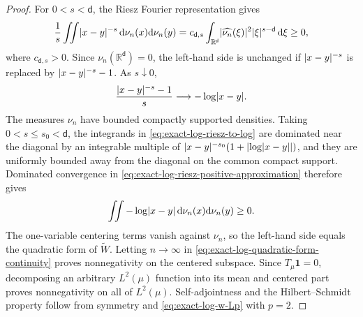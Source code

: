\documentclass[11pt,reqno]{amsart}
\numberwithin{equation}{section}
\theoremstyle{plain}
\theoremstyle{remark}
\DeclarePairedDelimiter{\abs}{\lvert}{\rvert}
\renewcommand{\d}{\mathsf{d}}
\newcommand{\md}{\mathrm{d}}
\newcommand{\R}{{\mathbb{R}}}
\newcommand{\tl}{\widetilde}
\newcommand{\one}{\mathbf 1}
\begin{document}
\begin{proof}
For $0<s<\d$, the Riesz Fourier representation gives
\begin{equation}\label{eq:exact-log-riesz-positive-approximation}
 \frac1s\iint\abs{x-y}^{-s}\,\md\nu_n(x)\md\nu_n(y)
 =c_{\d,s}\int_{\R^{\d}}
 \abs{\widehat{\nu_n}(\xi)}^2\abs{\xi}^{s-\d}\,\md\xi
 \geq0,
\end{equation}
where $c_{\d,s}>0$.  Since $\nu_n(\R^{\d})=0$, the left-hand side is unchanged if $\abs{x-y}^{-s}$ is replaced by $\abs{x-y}^{-s}-1$.  As $s\downarrow0$,
\begin{equation}\label{eq:exact-log-riesz-to-log}
 \frac{\abs{x-y}^{-s}-1}{s}
 \longrightarrow-\log\abs{x-y}.
\end{equation}
The measures $\nu_n$ have bounded compactly supported densities.  Taking $0<s\leq s_0<\d$, the integrands in \eqref{eq:exact-log-riesz-to-log} are dominated near the diagonal by an integrable multiple of $\abs{x-y}^{-s_0}(1+\abs{\log\abs{x-y}})$, and they are uniformly bounded away from the diagonal on the common compact support.  Dominated convergence in \eqref{eq:exact-log-riesz-positive-approximation} therefore gives
\begin{equation}\label{eq:exact-log-log-positive-compact}
 \iint-\log\abs{x-y}\,\md\nu_n(x)\md\nu_n(y)\geq0.
\end{equation}
The one-variable centering terms vanish against $\nu_n$, so the left-hand side equals the quadratic form of $\tl W$.  Letting $n\to\infty$ in \eqref{eq:exact-log-quadratic-form-continuity} proves nonnegativity on the centered subspace.  Since $T_\mu\one=0$, decomposing an arbitrary $L^2(\mu)$ function into its mean and centered part proves nonnegativity on all of $L^2(\mu)$.  Self-adjointness and the Hilbert--Schmidt property follow from symmetry and \eqref{eq:exact-log-w-Lp} with $p=2$.

\end{proof}
\end{document}
